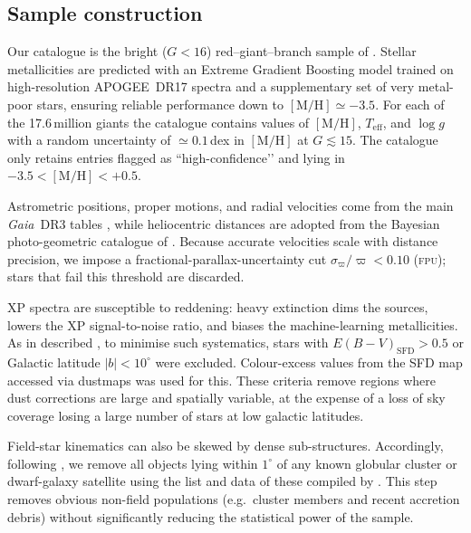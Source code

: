 \documentclass[a4paper,12pt]{article}
\begin{document}
\subsection{Sample construction}\label{subsec:data_sample}

Our catalogue is the bright ($G<16$) red–giant–branch sample of \citet{Andrae2023}.  
Stellar metallicities are predicted with an Extreme Gradient Boosting model 
trained on high-resolution \textsc{APOGEE}~DR17 spectra and a supplementary 
set of very metal-poor stars, ensuring reliable performance down to 
$[\mathrm{M/H}]\simeq-3.5$.  
For each of the 17.6\,million giants the catalogue contains values of 
$[\mathrm{M/H}]$, $T_{\mathrm{eff}}$, and $\log g$ with a random uncertainty 
of $\simeq0.1$\,dex in $[\mathrm{M/H}]$ at $G\!\lesssim\!15$.  
The catalogue only retains entries flagged as “high-confidence’’ and lying 
in $-3.5<[\mathrm{M/H}]<+0.5$.

Astrometric positions, proper motions, and radial velocities come from the main 
\textit{Gaia}~DR3 tables \citep{GaiaCollaboration2023}, while heliocentric 
distances are adopted from the Bayesian photo-geometric catalogue of 
\citet{BailerJones2021}.  
Because accurate velocities scale with distance precision, we impose a 
fractional-parallax-uncertainty cut $\sigma_{\varpi}/\varpi<0.10$ 
(\textsc{fpu}); stars that fail this threshold are discarded.

XP spectra are susceptible to reddening: heavy extinction dims the sources, 
lowers the XP signal-to-noise ratio, and biases the machine-learning metallicities.  
As in described \citet{zhang2024existencemetalpoordiscmilky}, to minimise 
such systematics, stars with $E(B{-}V)_{\mathrm{SFD}}>0.5$ or Galactic latitude 
$|b|<10^{\circ}$ were excluded. Colour-excess values from the SFD map accessed 
via dustmaps \citep{Green2018} was used for this.  
These criteria remove regions where dust corrections are large and spatially 
variable, at the expense of a loss of sky coverage losing a large number of stars 
at low galactic latitudes.

Field-star kinematics can also be skewed by dense sub-structures.  
Accordingly, following \citet{zhang2024existencemetalpoordiscmilky}, we remove 
all objects lying within $1^{\circ}$ of any known globular cluster or 
dwarf-galaxy satellite using the list and data of these compiled by 
\citet{Pace2024}.  
This step removes obvious non-field populations (e.g.\ cluster members and 
recent accretion debris) without significantly reducing the statistical power 
of the sample.
\end{document}
